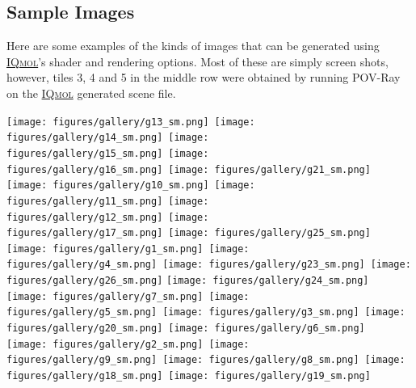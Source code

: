 \documentclass[a4paper,12pt]{article}
\newcommand{\iqmol}{\href{http://iqmol.org}{{\scshape IQmol}}}
\begin{document}
\newpage
\subsection{Sample Images}

Here are some examples of the kinds of images that can be generated using
\iqmol{}'s shader and rendering options.  Most of these are simply screen
shots, however, tiles 3, 4 and 5 in the middle row were obtained by 
running POV-Ray on the \iqmol{} generated scene file.

\begin{center}
\texttt{[image: figures/gallery/g13\_sm.png]}\
\texttt{[image: figures/gallery/g14\_sm.png]}\
\texttt{[image: figures/gallery/g15\_sm.png]}\
\texttt{[image: figures/gallery/g16\_sm.png]}\
\texttt{[image: figures/gallery/g21\_sm.png]} \\
\texttt{[image: figures/gallery/g10\_sm.png]}\
\texttt{[image: figures/gallery/g11\_sm.png]}\
\texttt{[image: figures/gallery/g12\_sm.png]}\
\texttt{[image: figures/gallery/g17\_sm.png]}\
\texttt{[image: figures/gallery/g25\_sm.png]} \\
\texttt{[image: figures/gallery/g1\_sm.png]}\
\texttt{[image: figures/gallery/g4\_sm.png]}\
\texttt{[image: figures/gallery/g23\_sm.png]}\
\texttt{[image: figures/gallery/g26\_sm.png]}
\texttt{[image: figures/gallery/g24\_sm.png]} \\
\texttt{[image: figures/gallery/g7\_sm.png]}\
\texttt{[image: figures/gallery/g5\_sm.png]}\
\texttt{[image: figures/gallery/g3\_sm.png]}\
\texttt{[image: figures/gallery/g20\_sm.png]}\
\texttt{[image: figures/gallery/g6\_sm.png]} \\
\texttt{[image: figures/gallery/g2\_sm.png]}\
\texttt{[image: figures/gallery/g9\_sm.png]}\
\texttt{[image: figures/gallery/g8\_sm.png]}\
\texttt{[image: figures/gallery/g18\_sm.png]}\
\texttt{[image: figures/gallery/g19\_sm.png]}\
\end{center}



\newpage




\end{document}
